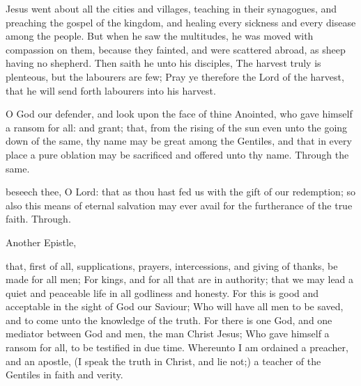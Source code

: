  Jesus went about all the cities and villages, teaching in their synagogues, and preaching the gospel of the kingdom, and healing every sickness and every disease among the people. But when he saw the multitudes, he was moved with compassion on them, because they fainted, and were scattered abroad, as sheep having no shepherd. Then saith he unto his disciples, The harvest truly is plenteous, but the labourers are few; Pray ye therefore the Lord of the harvest, that he will send forth labourers into his harvest.


\secret
{} O God our defender, and look upon the face of thine Anointed, who gave himself a ransom for all: and grant; that, from the rising of the sun even unto the going down of the same, thy name may be great among the Gentiles, and that in every place a pure oblation may be sacrificed and offered unto thy name. Through the same.


\postcommunion
{} beseech thee, O Lord: that as thou hast fed us with the gift of our redemption; so also this means of eternal salvation may ever avail for the furtherance of the true faith. Through.\\

\begin{inhead}
	Another Epistle,
\end{inhead}

 that, first of all, supplications, prayers, intercessions, and giving of thanks, be made for all men; For kings, and for all that are in authority; that we may lead a quiet and peaceable life in all godliness and honesty. For this is good and acceptable in the sight of God our Saviour; Who will have all men to be saved, and to come unto the knowledge of the truth. For there is one God, and one mediator between God and men, the man Christ Jesus; Who gave himself a ransom for all, to be testified in due time. Whereunto I am ordained a preacher, and an apostle, (I speak the truth in Christ, and lie not;) a teacher of the Gentiles in faith and verity.

